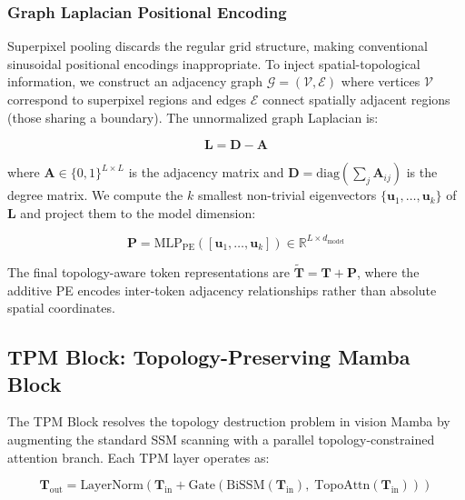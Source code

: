 \documentclass[lettersize,journal]{IEEEtran}
\begin{document}
\subsubsection{Graph Laplacian Positional Encoding}

Superpixel pooling discards the regular grid structure, making conventional sinusoidal positional encodings inappropriate. To inject spatial-topological information, we construct an adjacency graph $\mathcal{G} = (\mathcal{V}, \mathcal{E})$ where vertices $\mathcal{V}$ correspond to superpixel regions and edges $\mathcal{E}$ connect spatially adjacent regions (those sharing a boundary). The unnormalized graph Laplacian is:

\begin{equation}
\label{eq:laplacian}
\mathbf{L} = \mathbf{D} - \mathbf{A}
\end{equation}

where $\mathbf{A} \in \{0,1\}^{L \times L}$ is the adjacency matrix and $\mathbf{D} = \text{diag}(\sum_j \mathbf{A}_{ij})$ is the degree matrix. We compute the $k$ smallest non-trivial eigenvectors $\{\mathbf{u}_1, \ldots, \mathbf{u}_k\}$ of $\mathbf{L}$ and project them to the model dimension:

\begin{equation}
\label{eq:glpe}
\mathbf{P} = \text{MLP}_{\text{PE}}([\mathbf{u}_1, \ldots, \mathbf{u}_k]) \in \mathbb{R}^{L \times d_{\text{model}}}
\end{equation}

The final topology-aware token representations are $\tilde{\mathbf{T}} = \mathbf{T} + \mathbf{P}$, where the additive PE encodes inter-token adjacency relationships rather than absolute spatial coordinates.

\subsection{TPM Block: Topology-Preserving Mamba Block}
\label{sec:tpm}

The TPM Block resolves the topology destruction problem in vision Mamba by augmenting the standard SSM scanning with a parallel topology-constrained attention branch. Each TPM layer operates as:

\begin{equation}
\label{eq:tpm}
\mathbf{T}_{\text{out}} = \text{LayerNorm}\left(\mathbf{T}_{\text{in}} + \text{Gate}\left(\text{BiSSM}(\mathbf{T}_{\text{in}}),\; \text{TopoAttn}(\mathbf{T}_{\text{in}})\right)\right)
\end{equation}
\end{document}

